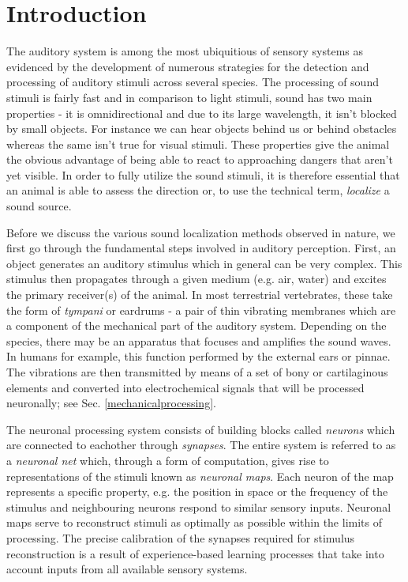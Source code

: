 \chapter{Introduction}\label{introchapter}
The auditory system is among the most ubiquitious of sensory systems as evidenced by the 
development of numerous strategies for the detection and processing of auditory stimuli
across several species. The processing of sound stimuli is fairly fast and in comparison
to light stimuli, sound has two main properties - it is omnidirectional and due to
its large wavelength, it isn't blocked by small objects. For instance we can hear objects
behind us or behind obstacles whereas the same isn't true for visual stimuli. These properties 
give the animal the obvious advantage of being able to react to approaching dangers that
aren't yet visible. In order to fully utilize the sound stimuli, it is therefore essential
that an animal is able to assess the direction or, to use the technical term, \emph{localize} a sound source.

Before we discuss the various sound localization methods observed in nature, we first
go through the fundamental steps involved in auditory perception. First, an object generates
an auditory stimulus which in general can be very complex. This stimulus then propagates
through a given medium (e.g. air, water) and excites the primary receiver(s) of the animal. In most
terrestrial vertebrates, these take the form of \emph{tympani} or eardrums - a pair of thin vibrating
membranes which are a component of the mechanical part of the auditory system.
Depending on the species, there may be an apparatus that focuses and amplifies the sound waves. In
humans for example, this function performed by the external ears or pinnae. 
The vibrations are then transmitted by means of a set of bony or cartilaginous elements and
converted into electrochemical signals that will be processed neuronally; see Sec. \ref{mechanicalprocessing}.

The neuronal processing system consists of building blocks called \emph{neurons} which are
connected to eachother through \emph{synapses}. The entire system is referred to as a 
\emph{neuronal net} which, through a form of computation, gives rise to representations of the stimuli
known as \emph{neuronal maps}. Each neuron of the map represents a specific property, e.g.
the position in space or the frequency of the stimulus and neighbouring neurons respond to
similar sensory inputs. Neuronal maps serve to reconstruct stimuli as optimally as possible
within the limits of processing. The precise calibration of the
synapses required for stimulus reconstruction is a result of experience-based learning
processes that take into account inputs from all available sensory systems.

